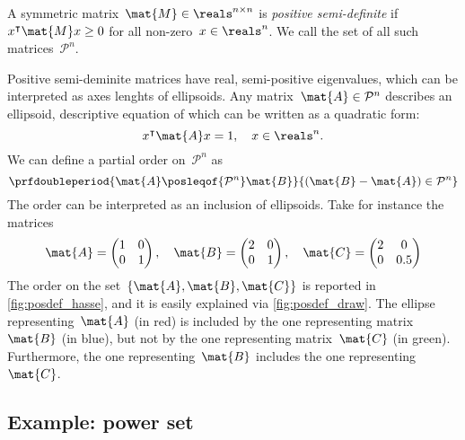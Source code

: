 \begin{example}
    \begin{definition}
        A symmetric matrix~$\mat{M}\in \reals^{n\times n}$ is \emph{positive semi-definite} if~$x^\intercal \mat{M}x\geq 0$ for all non-zero~$x\in \reals^n$.
        We call the set of all such matrices~$\mathcal{P}^n$.
    \end{definition}
    Positive semi-deminite matrices have real, semi-positive eigenvalues, which can be interpreted as axes lenghts of ellipsoids.
    Any matrix~$\mat{A}\in \mathcal{P}^n$ describes an ellipsoid, descriptive equation of which can be written as a quadratic form:
    \begin{equation*}
        x^\intercal \mat{A}x=1,\quad x\in \reals^n.
    \end{equation*}
    We can define a partial order on~$\mathcal{P}^n$ as
    \begin{equation*}
        \prfdoubleperiod{
            \mat{A}\posleqof{\mathcal{P}^n} \mat{B}
        }{
            (\mat{B}-\mat{A})\in \mathcal{P}^n
        }
    \end{equation*}
    The order can be interpreted as an inclusion of ellipsoids.
    Take for instance the matrices
    \begin{equation*}
        \mat{A}=
        \begin{pmatrix}
            1 & 0 \\0& 1
        \end{pmatrix}, \quad \mat{B}=
        \begin{pmatrix}
            2 & 0 \\0& 1
        \end{pmatrix},\quad \mat{C}=
        \begin{pmatrix}
            2 & 0 \\0& 0.5
        \end{pmatrix}
    \end{equation*}
    The order on the set~$\{\mat{A},\mat{B},\mat{C}\}$ is reported in \cref{fig:posdef_hasse}, and it is easily explained via \cref{fig:posdef_draw}.
    The ellipse representing~$\mat{A}$ (in red) is included by the one representing matrix~$\mat{B}$ (in blue), but not by the one representing matrix~$\mat{C}$ (in green).
    Furthermore, the one representing~$\mat{B}$ includes the one representing~$\mat{C}$.
\end{example}

\subsection{Example: power set}

